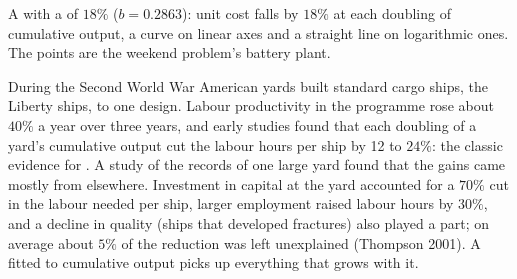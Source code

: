 \begin{omfigure}

{\small A  with a  of $18\%$ ($b = 0.2863$): unit cost
falls by $18\%$ at each doubling of cumulative output, a curve on linear axes
and a straight line on logarithmic ones. The points are the weekend
problem's battery plant.}
\end{omfigure}

\begin{record}
During the Second World War American yards built standard cargo ships, the
Liberty ships, to one design. Labour productivity in the programme rose
about $40\%$ a year over three years, and early studies found that each
doubling of a yard's cumulative output cut the labour hours per ship by 12
to $24\%$: the classic evidence for . A study of the
records of one large yard found that the gains came mostly from elsewhere.
Investment in capital at the yard accounted for a $70\%$ cut in the labour
needed per ship, larger employment raised labour hours by $30\%$, and a
decline in quality (ships that developed fractures) also played a part;
on average about $5\%$ of the reduction was left unexplained
(Thompson 2001). %
A  fitted to cumulative output picks up everything that
grows with it.
\end{record}

